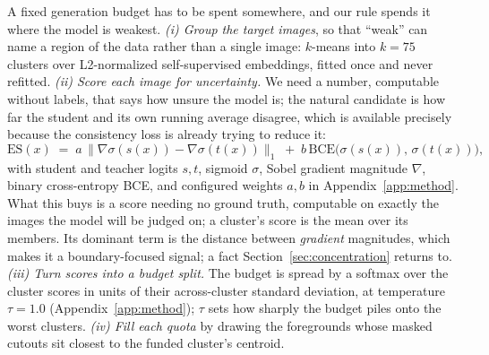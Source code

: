 \documentclass{article}
\newcommand{\atemp}{\tau}
\begin{document}
A fixed generation budget has to be spent somewhere, and our rule spends it where the model is weakest. \textit{(i) Group the target images}, so that
``weak'' can name a region of the data rather than a single image: $k$-means into $k = 75$ clusters
over L2-normalized self-supervised embeddings, fitted once and never refitted. \textit{(ii) Score
each image for uncertainty.} We need a number, computable without labels, that says how unsure the model is; the natural candidate is how far the student and its own running average disagree, which
is available precisely because the consistency loss is already trying to reduce it:
\begin{equation}
\mathrm{ES}(x) \;=\; a \,\big\| \nabla \sigma(s(x)) - \nabla \sigma(t(x)) \big\|_{1}
\;+\; b \, \mathrm{BCE}\big( \sigma(s(x)),\, \sigma(t(x)) \big),
\label{eq:es}
\end{equation}
with student and teacher logits $s,t$, sigmoid $\sigma$, Sobel gradient magnitude $\nabla$, binary
cross-entropy BCE, and
configured weights $a, b$ in Appendix~\ref{app:method}. What this buys is a score needing no ground
truth, computable on exactly the images the model will be judged on; a cluster's score is the mean
over its members. Its dominant term is the distance between \emph{gradient} magnitudes, which makes it a boundary-focused signal; a fact Section~\ref{sec:concentration} returns to. \textit{(iii) Turn scores into a budget split.} The budget is spread by a softmax over the cluster scores in units of their across-cluster standard deviation, at temperature $\atemp = 1.0$ (Appendix~\ref{app:method}); $\atemp$ sets how sharply the
budget piles onto the worst clusters.
\textit{(iv) Fill each quota} by drawing the foregrounds whose masked cutouts sit closest to the
funded cluster's centroid.
\end{document}
